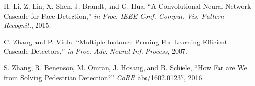 \documentclass[journal]{IEEEtran}
\begin{document}
\begin{thebibliography}{1}
H. Li, Z. Lin, X. Shen, J. Brandt, and G. Hua, ``A Convolutional Neural Network Cascade for Face Detection,'' \emph{in Proc. IEEE Conf. Comput. Vis. Pattern Recognit.}, 2015.

C. Zhang and P. Viola, ``Multiple-Instance Pruning For Learning Efficient Cascade Detectors,'' \emph{in Proc. Adv. Neural Inf. Process}, 2007.

S. Zhang, R. Benenson, M. Omran, J. Hosang, and B. Schiele, ``How Far are We from Solving Pedestrian Detection?'' \emph{CoRR} abs/1602.01237, 2016.



\end{thebibliography}
\end{document}
